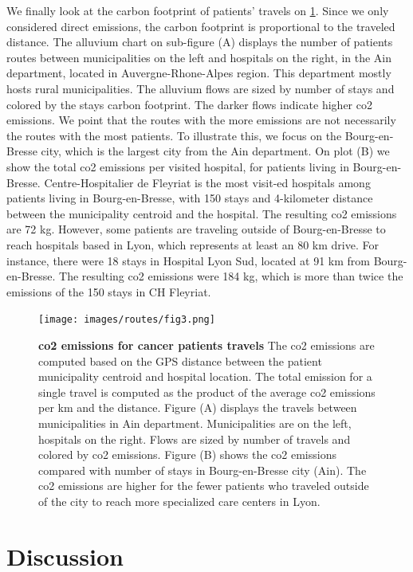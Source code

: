 We finally look at the carbon footprint of patients' travels on \cref{fig:routes-co2-emissions}. Since we only considered direct emissions, the carbon footprint is proportional to the traveled distance. The alluvium chart on sub-figure (A) displays the number of patients routes between municipalities on the left and hospitals on the right, in the Ain department, located in Auvergne-Rhone-Alpes region. This department mostly hosts rural municipalities. The alluvium flows are sized by number of stays and colored by the stays carbon footprint. The darker flows indicate higher \ac{co2} emissions. We point that the routes with the more emissions are not necessarily the routes with the most patients. To illustrate this, we focus on the Bourg-en-Bresse city, which is the largest city from the Ain department. On plot (B) we show the total \ac{co2} emissions per visited hospital, for patients living in Bourg-en-Bresse. Centre-Hospitalier de Fleyriat is the most visit-ed hospitals among patients living in Bourg-en-Bresse, with 150 stays and 4-kilometer distance between the municipality centroid and the hospital. The resulting \ac{co2} emissions are 72 kg. However, some patients are traveling outside of Bourg-en-Bresse to reach hospitals based in Lyon, which represents at least an 80 km drive. For instance, there were 18 stays in Hospital Lyon Sud, located at 91 km from Bourg-en-Bresse. The resulting \ac{co2} emissions were 184 kg, which is more than twice the emissions of the 150 stays in CH Fleyriat.

\begin{figure}[H]
    \texttt{[image: images/routes/fig3.png]}
    \centering
    \caption{
        \textbf{\ac{co2} emissions for cancer patients travels} The \ac{co2} emissions are computed based on the GPS distance between the patient municipality centroid and hospital location. The total emission for a single travel is computed as the product of the average \ac{co2} emissions per km and the distance. Figure (A) displays the travels between municipalities in Ain department. Municipalities are on the left, hospitals on the right. Flows are sized by number of travels and colored by \ac{co2} emissions. Figure (B) shows the \ac{co2} emissions compared with number of stays in Bourg-en-Bresse city (Ain). The \ac{co2} emissions are higher for the fewer patients who traveled outside of the city to reach more specialized care centers in Lyon.
    }
    \label{fig:routes-co2-emissions}
\end{figure}

\section{Discussion}

